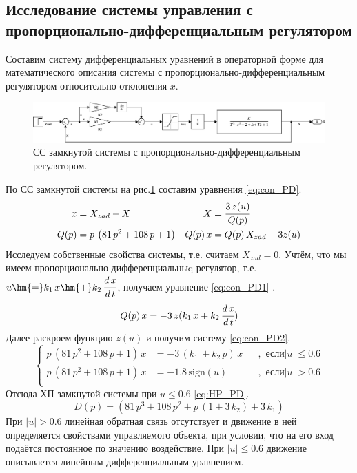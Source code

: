 \subsection{Исследование системы управления с \\ пропорционально-дифференциальным регулятором} \label{title:PDR}
Составим систему
дифференциальных уравнений в операторной форме  для математического описания системы с пропорционально-дифференциальным регулятором 
относительно отклонения $x$.
\begin{figure}[!h]\centering
\includegraphics[width=1.0\linewidth]{images/sim_PD}
\caption{СС замкнутой системы с пропорционально-дифференциальным регулятором.}\label{fig:sim_PD}
\end{figure}
По СС замкнутой системы на рис.\ref{fig:sim_PD} составим уравнения \eqref{eq:con_PD}.
\begin{equation}
    \begin{aligned} \label{eq:con_PD}
       x&=X_{zad}-X & X&=\cfrac{3\,z(u)}{Q(p)}\\
       Q(p)&=p\,\left(81\,p^2+108\,p+1\right)&Q(p)\,x&=Q(p)\,X_{zad}-3z(u)\\
    \end{aligned}
\end{equation}
Исследуем собственные свойства системы, т.е. считаем $X_{zad}=0$.
 Учтём, что мы имеем пропорционально-дифференциальныq регулятор, т.е. $u\hm{=}k_1\,x\hm{+}k_2\,\cfrac{d\,x}{d\,t}$, получаем уравнение
 \eqref{eq:con_PD1}
.
\begin{equation} \label{eq:con_PD1}
Q(p)\,x=-3\,z(k_1\,x+k_2\,\cfrac{d\,x}{d\,t})
\end{equation}
Далее раскроем функцию $z(u)$ и получим систему \eqref{eq:con_PD2}.
\begin{equation}
    \left\{
    \begin{aligned} \label{eq:con_PD2}
       p\,\left(81\,p^2+108\,p+1\right)\,x&=-3\,\left(k_1\,+k_2\,p\right)\,x&&, \text{ если}|u|\le 0.6\\
       p\,\left(81\,p^2+108\,p+1\right)\,x&=-1.8\,\mathrm{sign}\left(u\right)&&, \text{ если}|u|> 0.6\\
    \end{aligned}
    \right.
\end{equation}
Отсюда ХП замкнутой системы при $u\le0.6$ \eqref{eq:HP_PD}.
\begin{equation} \label{eq:HP_PD}
D(p)=\left(81\,p^3+108\,p^2+p\,\left(1+3\,k_2\right)+3\,k_1\right)
\end{equation}
При $|u|>0.6$ линейная обратная связь отсутствует и движение в ней определяется свойствами управляемого объекта, при условии, что на его вход подаётся постоянное по значению воздействие. При $|u|\le0.6$ движение описывается линейным дифференциальным уравнением.

